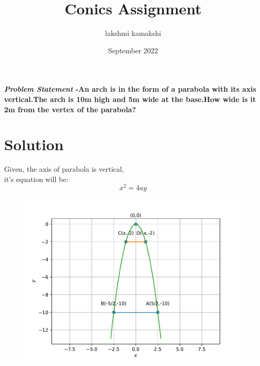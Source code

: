 \documentclass[journal,10pt,twocolumn]{article}
\title{\textbf{Conics Assignment}}
\author{lakshmi kamakshi}
\date{September 2022}
\begin{document}
\maketitle
\paragraph{\textit{Problem Statement} -An arch is in the form of a parabola with its axis vertical.The arch is 10m high and 5m wide at the base.How wide is it 2m from the vertex of the parabola?} \vspace{5mm}

\section*{Solution}


Given, the axis of parabola is vertical,
\\ it's equation will be:
\begin{equation}
  x^2 = 4ay
  \end{equation}
\begin{figure}[h]
\includegraphics[width=1\columnwidth]{fig.pdf}
\end{figure}
\end{document}

